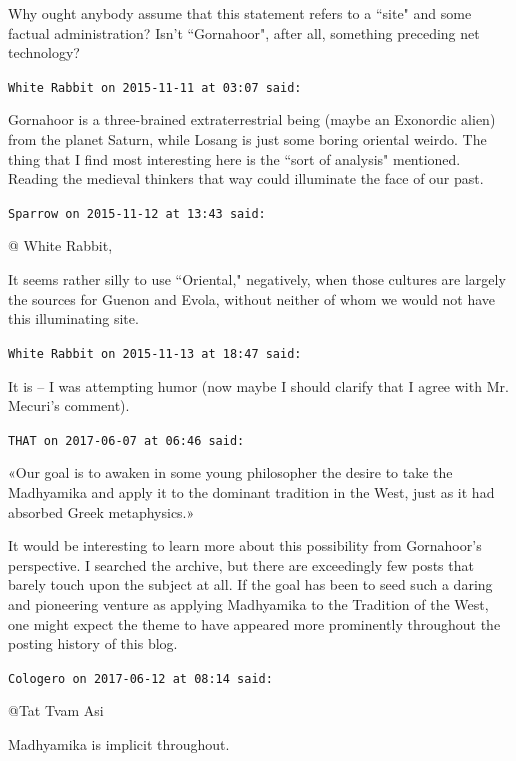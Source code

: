 \begin{footnotesize}
\begin{sffamily}
Why ought anybody assume that this statement refers to a ``site" and some factual administration? Isn't ``Gornahoor", after all, something preceding net technology?


\hfill

\texttt{White Rabbit on 2015-11-11 at 03:07 said: }

Gornahoor is a three-brained extraterrestrial being (maybe an Exonordic alien) from the planet Saturn, while Losang is just some boring oriental weirdo. The thing that I find most interesting here is the ``sort of analysis" mentioned. Reading the medieval thinkers that way could illuminate the face of our past.


\hfill

\texttt{Sparrow on 2015-11-12 at 13:43 said: }

@ White Rabbit,

It seems rather silly to use ``Oriental," negatively, when those cultures are largely the sources for Guenon and Evola, without neither of whom we would not have this illuminating site.


\hfill

\texttt{White Rabbit on 2015-11-13 at 18:47 said: }

It is – I was attempting humor (now maybe I should clarify that I agree with Mr. Mecuri's comment).


\hfill

\texttt{THAT on 2017-06-07 at 06:46 said: }

«Our goal is to awaken in some young philosopher the desire to take the Madhyamika and apply it to the dominant tradition in the West, just as it had absorbed Greek metaphysics.»

It would be interesting to learn more about this possibility from Gornahoor's perspective. I searched the archive, but there are exceedingly few posts that barely touch upon the subject at all. If the goal has been to seed such a daring and pioneering venture as applying Madhyamika to the Tradition of the West, one might expect the theme to have appeared more prominently throughout the posting history of this blog.


\hfill

\texttt{Cologero on 2017-06-12 at 08:14 said: }

@Tat Tvam Asi

Madhyamika is implicit throughout.


\hfill


\end{sffamily}\end{footnotesize}
